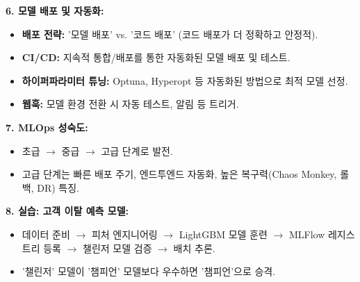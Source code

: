 \documentclass[11pt,a4paper]{article}
\begin{document}
\begin{tcolorbox}[colback=myblue!10!white, colframe=myblue!75!black, title=\textbf{CSCI103 Lecture 9 핵심 요약}]
\textbf{6. 모델 배포 및 자동화:}
\begin{itemize}
    \item \textbf{배포 전략:} '모델 배포' vs. '코드 배포' (코드 배포가 더 정확하고 안정적).
    \item \textbf{CI/CD:} 지속적 통합/배포를 통한 자동화된 모델 배포 및 테스트.
    \item \textbf{하이퍼파라미터 튜닝:} Optuna, Hyperopt 등 자동화된 방법으로 최적 모델 선정.
    \item \textbf{웹훅:} 모델 환경 전환 시 자동 테스트, 알림 등 트리거.
\end{itemize}

\textbf{7. MLOps 성숙도:}
\begin{itemize}
    \item 초급 $\rightarrow$ 중급 $\rightarrow$ 고급 단계로 발전.
    \item 고급 단계는 빠른 배포 주기, 엔드투엔드 자동화, 높은 복구력(Chaos Monkey, 롤백, DR) 특징.
\end{itemize}

\textbf{8. 실습: 고객 이탈 예측 모델:}
\begin{itemize}
    \item 데이터 준비 $\rightarrow$ 피처 엔지니어링 $\rightarrow$ LightGBM 모델 훈련 $\rightarrow$ MLFlow 레지스트리 등록 $\rightarrow$ 챌린저 모델 검증 $\rightarrow$ 배치 추론.
    \item '챌린저' 모델이 '챔피언' 모델보다 우수하면 '챔피언'으로 승격.
\end{itemize}

\end{tcolorbox}
\end{document}
